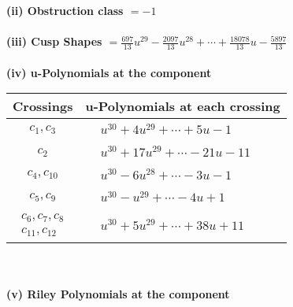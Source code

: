 \documentclass[1p]{elsarticle_modified}
\theoremstyle{definition}
\begin{document}
\flushleft \textbf{(ii) Obstruction class $= -1$}\\~\\
\flushleft \textbf{(iii) Cusp Shapes $= \frac{697}{13} u^{29}-\frac{2097}{13} u^{28}+\cdots+\frac{18078}{13} u-\frac{5897}{13}$}\\~\\
\newpage\renewcommand{\arraystretch}{1}
\flushleft \textbf{(iv) u-Polynomials at the component}\newline \\
\begin{tabular}{m{50pt}|m{274pt}}
Crossings & \hspace{64pt}u-Polynomials at each crossing \\
\hline $$\begin{aligned}c_{1},c_{3}\end{aligned}$$&$\begin{aligned}
&u^{30}+4 u^{29}+\cdots+5 u-1
\end{aligned}$\\
\hline $$\begin{aligned}c_{2}\end{aligned}$$&$\begin{aligned}
&u^{30}+17 u^{29}+\cdots-21 u-11
\end{aligned}$\\
\hline $$\begin{aligned}c_{4},c_{10}\end{aligned}$$&$\begin{aligned}
&u^{30}-6 u^{28}+\cdots-3 u-1
\end{aligned}$\\
\hline $$\begin{aligned}c_{5},c_{9}\end{aligned}$$&$\begin{aligned}
&u^{30}- u^{29}+\cdots-4 u+1
\end{aligned}$\\
\hline $$\begin{aligned}c_{6},c_{7},c_{8}\\c_{11},c_{12}\end{aligned}$$&$\begin{aligned}
&u^{30}+5 u^{29}+\cdots+38 u+11
\end{aligned}$\\
\hline
\end{tabular}\\~\\
\newpage\renewcommand{\arraystretch}{1}
\flushleft \textbf{(v) Riley Polynomials at the component}\newline \\
\end{document}
